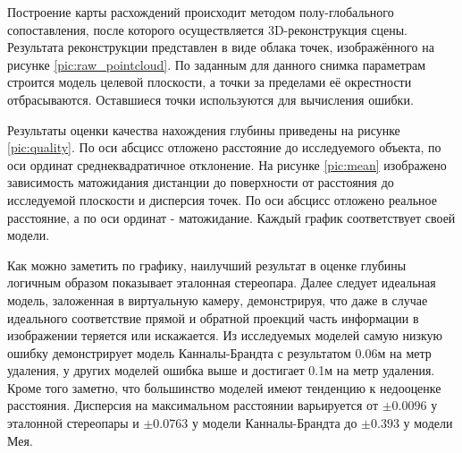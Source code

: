 
Построение карты расхождений происходит методом полу-глобального  сопоставления, после которого осуществляется 3D-реконструкция сцены. 
Результата реконструкции представлен  в виде облака точек,  изображённого на рисунке \ref{pic:raw_pointcloud}.
По заданным для данного снимка параметрам строится модель целевой плоскости, а точки за пределами её окрестности отбрасываются. %
Оставшиеся точки используются для вычисления ошибки. 


Результаты оценки качества нахождения глубины приведены на рисунке \ref{pic:quality}. По оси абсцисс отложено расстояние до исследуемого объекта,
по оси ординат среднеквадратичное отклонение. На рисунке \ref{pic:mean} изображено зависимость матожидания дистанции до поверхности от расстояния 
до исследуемой плоскости и дисперсия точек. По оси абсцисс отложено реальное расстояние, а по оси ординат - матожидание. Каждый график соответствует своей модели.



Как можно заметить по графику, наилучший результат в оценке глубины логичным образом показывает эталонная стереопара. Далее следует 
идеальная модель, заложенная в виртуальную камеру, демонстрируя, что даже в случае идеального соответствие прямой и обратной проекций часть 
информации в изображении теряется или искажается. Из исследуемых моделей самую низкую ошибку демонстрирует модель Канналы-Брандта с результатом
0.06м на метр удаления, у других моделей ошибка выше и достигает 0.1м на метр удаления. Кроме того заметно, что большинство моделей имеют тенденцию
к недооценке расстояния.  Дисперсия на максимальном расстоянии варьируется от $\pm 0.0096$ у эталонной стереопары и $\pm 0.0763$ у модели Канналы-Брандта 
до $\pm 0.393$ у модели Мея. 



